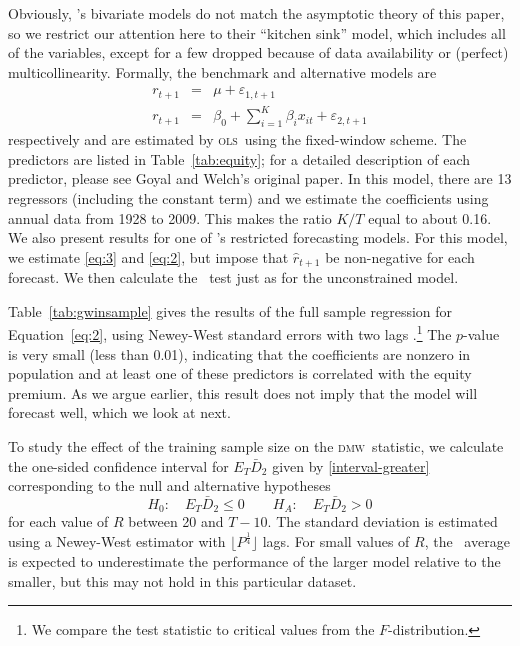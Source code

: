 \documentclass[11pt]{article}
\newcommand{\citepos}[1]{\citeauthor{#1}'s \citeyearpar{#1}}
\newcommand{\dmw}{\textsc{dmw}}
\newcommand{\ols}{\textsc{ols}}
\begin{document}
Obviously, \citepos{GoW:08} bivariate models do not
match the asymptotic theory of this paper, so we restrict our
attention here to their ``kitchen sink'' model, which includes all of
the variables, except for a few dropped because of data availability or
(perfect) multicollinearity.  Formally, the benchmark and alternative models are
\begin{eqnarray}
  \label{eq:3}
  r_{t+1} &=& \mu + \varepsilon_{1,t+1} \\
  \label{eq:2}
r_{t+1} &=& \beta_0 + \sum_{i=1}^K \beta_{i} x_{it} + \varepsilon_{2,t+1}  
\end{eqnarray}
respectively and are estimated by \ols\ using the fixed-window scheme.
The predictors are listed in Table~\ref{tab:equity}; for a detailed
description of each predictor, please see Goyal and Welch's original
paper.  In this model, there are 13 regressors (including the constant
term) and we estimate the coefficients using annual data from 1928 to
2009.  This makes the ratio $K/T$ equal to about 0.16.  We also
present results for one of \citepos{CaT:08}
restricted forecasting models.  For this model, we estimate
\eqref{eq:3} and \eqref{eq:2}, but impose that $\hat r_{t+1}$ be
non-negative for each forecast.  We then calculate the \oos\ test just
as for the unconstrained model.

Table~\ref{tab:gwinsample} gives the results of the full sample
regression for Equation~\eqref{eq:2}, using Newey-West standard errors
with two lags \citep{NeW:87}.\footnote{We compare the test statistic
  to critical values from the $F$-distribution.}  The $p$-value is
very small (less than 0.01), indicating that the coefficients are
nonzero in population and at least one of these predictors is
correlated with the equity premium.  As we argue earlier, this result
does not imply that the model will forecast well, which we look at
next.

To study the effect of the training sample size on the \dmw\ statistic, we
calculate the one-sided confidence interval for $E_T \bar D_2$ given
by \eqref{interval-greater} corresponding to the null and alternative
hypotheses
\[ H_0: \quad E_T \bar D_2 \leq 0 \qquad
H_A: \quad E_T \bar D_2 > 0
\]
for each value of $R$ between 20 and $T-10$.  The standard deviation
is estimated using a Newey-West estimator with $\lfloor
P^{\frac14}\rfloor$ lags.  For small values of $R$, the \oos\ average
is expected to underestimate the performance of the larger model
relative to the smaller, but this may not hold in this particular
dataset.
\end{document}
